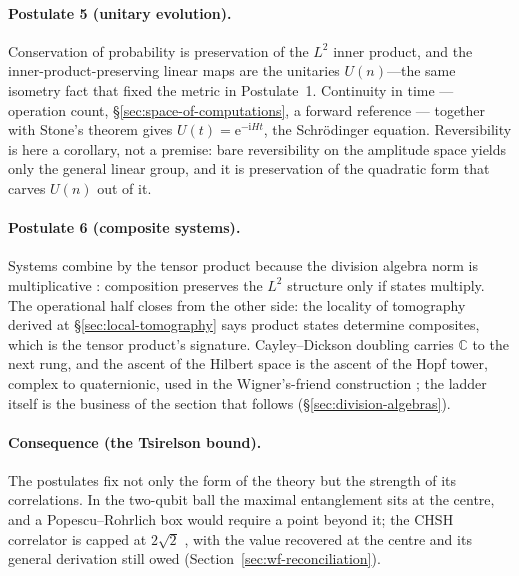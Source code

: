 \paragraph{Postulate 5 (unitary evolution).}
Conservation of probability is preservation of the $L^{2}$ inner product, and the
inner-product-preserving linear maps are the unitaries $U(n)$---the same
isometry fact that fixed the metric in Postulate~1. Continuity in time --- operation count,
\S\ref{sec:space-of-computations}, a forward reference --- together with Stone's theorem
\autocite{stone1932one} gives $U(t)=\mathrm{e}^{-\mathrm{i}Ht}$, the Schr\"odinger
equation. Reversibility is here a corollary, not a premise: bare reversibility on
the amplitude space yields only the general linear group, and it is preservation
of the quadratic form that carves $U(n)$ out of it.

\paragraph{Postulate 6 (composite systems).}
Systems combine by the tensor product because the division algebra norm is
multiplicative \autocite{hurwitz1898composition}: composition preserves the $L^{2}$ structure
only if states multiply. The operational half closes from the other side: the locality of
tomography derived at \S\ref{sec:local-tomography} says product states determine composites,
which is the tensor product's signature. Cayley--Dickson doubling carries $\mathbb{C}$ to the next
rung, and the ascent of the Hilbert space is the ascent of the Hopf tower, complex
to quaternionic, used in the Wigner's-friend construction
\autocite{mosseri2001hopf}; the ladder itself is the business of the section that follows
(\S\ref{sec:division-algebras}).

\paragraph{Consequence (the Tsirelson bound).}
The postulates fix not only the form of the theory but the strength of its
correlations. In the two-qubit ball the maximal entanglement sits at the centre,
and a Popescu--Rohrlich box \autocite{PopescuRohrlich1994} would require a point
beyond it; the CHSH correlator is capped at $2\sqrt{2}$
\autocite{Cirelson1980QuantumInequality, VerstraeteWolf2002, Held2021}, with the value recovered
at the centre and its general derivation still owed
(Section~\ref{sec:wf-reconciliation}).

